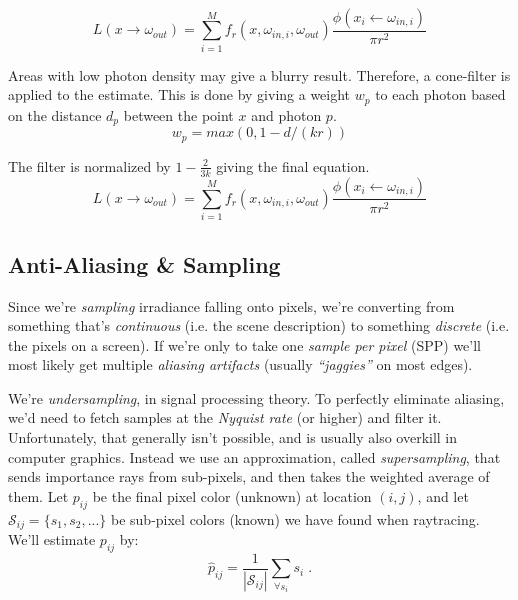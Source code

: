 \documentclass[a4paper, twocolumn]{article}
\begin{document}
            \begin{equation*}
              L(x \rightarrow \omega_{out}) = \sum_{i=1}^M f_r(x, \omega_{in,i}, \omega_{out}) \frac{\phi(x_i \leftarrow \omega_{in,i})}{\pi r^2}
            \end{equation*}

            Areas with low photon density may give a blurry result. Therefore, a cone-filter is applied to the estimate. This is done by giving a weight $w_p$ to each photon based on the distance $d_p$ between the point $x$ and photon $p$. 
            \begin{equation*}
              w_p = max(0, 1 - d/(kr))
            \end{equation*}

            The filter is normalized by $1 - \tfrac{2}{3k}$ giving the final equation.
            \begin{equation*}
         L(x \rightarrow \omega_{out}) = \sum_{i=1}^M f_r(x, \omega_{in,i}, \omega_{out}) \frac{\phi(x_i \leftarrow \omega_{in,i}) }{\pi r^2}
            \end{equation*}


        \clearpage

        \subsection{Anti-Aliasing \& Sampling} \label{sec:anti-aliasing_and_sampling}

            Since we're \emph{sampling} irradiance falling onto pixels, we're converting from something that's \emph{continuous} (i.e. the scene description) to something \emph{discrete} (i.e. the pixels on a screen). If we're only to take one \emph{sample per pixel} (SPP) we'll most likely get multiple \emph{aliasing artifacts} (usually \emph{``jaggies''} on most edges).

            We're \emph{undersampling}, in signal processing theory. To perfectly eliminate aliasing, we'd need to fetch samples at the \emph{Nyquist rate} (or higher) and filter it. Unfortunately, that generally isn't possible, and is usually also overkill in computer graphics. Instead we use an approximation, called \emph{supersampling}, that sends importance rays from sub-pixels, and then takes the weighted average of them. Let \(p_{ij}\) be the final pixel color (unknown) at location \((i,j)\), and let \(\mathcal{S}_{ij} = \{s_1, s_2, ...\}\) be sub-pixel colors (known) we have found when raytracing. We'll estimate \(p_{ij}\) by: \[\hat{p}_{ij} = \frac{1}{|\mathcal{S}_{ij}|}\sum_{\forall s_i } s_i \; .\]
\end{document}
